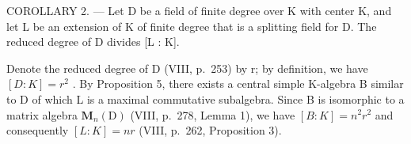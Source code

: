 COROLLARY 2. --- Let D be a field of finite degree over K with center K, and let L be an extension of K of finite degree that is a splitting field for D. The reduced degree of D divides {[}L : K{]}.

Denote the reduced degree of D (VIII, p.~253) by r; by definition, we have \([D:K]=r^{2}\) . By Proposition 5, there exists a central simple K-algebra B similar to D of which L is a maximal commutative subalgebra. Since B is isomorphic to a matrix algebra \(\mathbf{M}_{n}(\mathrm{D})\) (VIII, p.~278, Lemma 1), we have \([B:K]=n^{2}r^{2}\) and consequently \([L:K]=nr\) (VIII, p.~262, Proposition 3).

